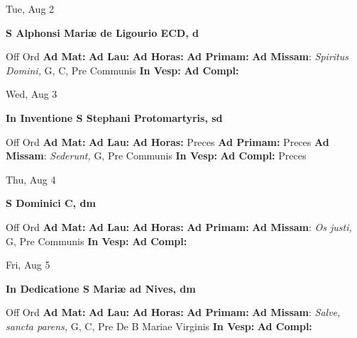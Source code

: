 \documentclass[10pt]{article}
\begin{document}
\begin{minipage}{3.5in}
\vspace{2em}\begin{center}
Tue, Aug 2
\end{center}\textbf{ \large S Alphonsi Mariæ de Ligourio ECD, \textnormal{\normalsize d}}
\begin{justify}
Off Ord
\textbf{Ad Mat: }
\textbf{Ad Lau: }
\textbf{Ad Horas: }
\textbf{Ad Primam: }
\textbf{Ad Missam}: \textit{Spiritus Domini,} G, C, Pre Communis
\textbf{In Vesp: }
\textbf{Ad Compl: }\end{justify}
\end{minipage}



\begin{minipage}{3.5in}
\vspace{2em}\begin{center}
Wed, Aug 3
\end{center}\textbf{ \large In Inventione S Stephani Protomartyris, \textnormal{\normalsize sd}}
\begin{justify}
Off Ord
\textbf{Ad Mat: }
\textbf{Ad Lau: }
\textbf{Ad Horas: }Preces
\textbf{Ad Primam: }Preces
\textbf{Ad Missam}: \textit{Sederunt,} G, Pre Communis
\textbf{In Vesp: }
\textbf{Ad Compl: }Preces\end{justify}
\end{minipage}



\begin{minipage}{3.5in}
\vspace{2em}\begin{center}
Thu, Aug 4
\end{center}\textbf{ \large S Dominici C, \textnormal{\normalsize dm}}
\begin{justify}
Off Ord
\textbf{Ad Mat: }
\textbf{Ad Lau: }
\textbf{Ad Horas: }
\textbf{Ad Primam: }
\textbf{Ad Missam}: \textit{Os justi,} G, Pre Communis
\textbf{In Vesp: }
\textbf{Ad Compl: }\end{justify}
\end{minipage}



\begin{minipage}{3.5in}
\vspace{2em}\begin{center}
Fri, Aug 5
\end{center}\textbf{ \large In Dedicatione S Mariæ ad Nives, \textnormal{\normalsize dm}}
\begin{justify}
Off Ord
\textbf{Ad Mat: }
\textbf{Ad Lau: }
\textbf{Ad Horas: }
\textbf{Ad Primam: }
\textbf{Ad Missam}: \textit{Salve, sancta parens,} G, C, Pre De B Mariae Virginis
\textbf{In Vesp: }
\textbf{Ad Compl: }\end{justify}
\end{minipage}
\end{document}
